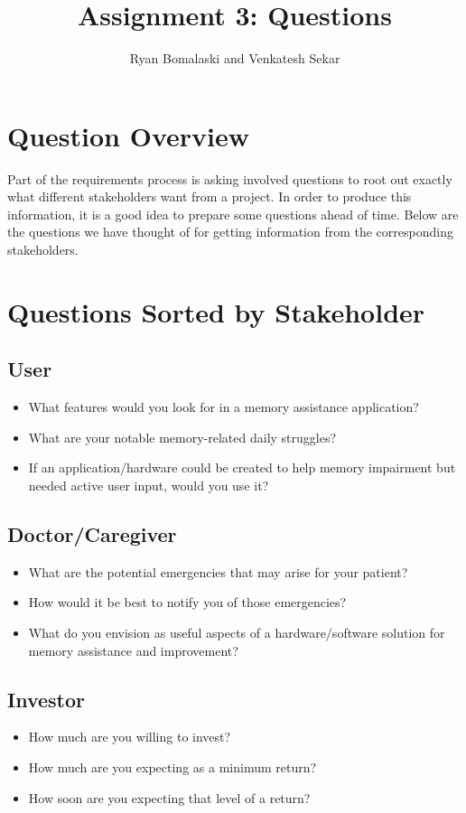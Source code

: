 \documentclass[12pt]{article}
\begin{document}
\title{Assignment 3: Questions}
\author{Ryan Bomalaski and Venkatesh Sekar}

\maketitle

\section*{Question Overview}
Part of the requirements process is asking involved questions to root out exactly what different stakeholders want from a project.  In order to produce this information, it is a good idea to prepare some questions ahead of time.  Below are the questions we have thought of for getting information from the corresponding stakeholders.


\section*{Questions Sorted by Stakeholder}
\subsection*{User}
\begin{itemize}
  \item What features would you look for in a memory assistance application?
  \item What are your notable memory-related daily struggles?
  \item If an application/hardware could be created to help memory impairment but needed active user input, would you use it?
\end{itemize}

\subsection*{Doctor/Caregiver}
\begin{itemize}
  \item What are the potential emergencies that may arise for your patient?
  \item How would it be best to notify you of those emergencies?
  \item What do you envision as useful aspects of a hardware/software solution for memory assistance and improvement?
\end{itemize}

\subsection*{Investor}
\begin{itemize}
  \item How much are you willing to invest?
  \item How much are you expecting as a minimum return?
  \item How soon are you expecting that level of a return?
\end{itemize}
\end{document}
